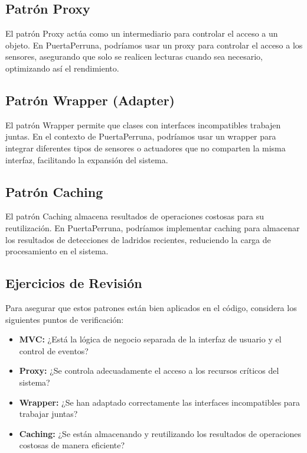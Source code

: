 \subsection{Patrón Proxy}

El patrón Proxy actúa como un intermediario para controlar el acceso a un objeto. En PuertaPerruna, podríamos usar un proxy para controlar el acceso a los sensores, asegurando que solo se realicen lecturas cuando sea necesario, optimizando así el rendimiento.

\subsection{Patrón Wrapper (Adapter)}

El patrón Wrapper permite que clases con interfaces incompatibles trabajen juntas. En el contexto de PuertaPerruna, podríamos usar un wrapper para integrar diferentes tipos de sensores o actuadores que no comparten la misma interfaz, facilitando la expansión del sistema.

\subsection{Patrón Caching}

El patrón Caching almacena resultados de operaciones costosas para su reutilización. En PuertaPerruna, podríamos implementar caching para almacenar los resultados de detecciones de ladridos recientes, reduciendo la carga de procesamiento en el sistema.

\subsection{Ejercicios de Revisión}

Para asegurar que estos patrones están bien aplicados en el código, considera los siguientes puntos de verificación:

\begin{itemize}
    \item \textbf{MVC:} ¿Está la lógica de negocio separada de la interfaz de usuario y el control de eventos?
    \item \textbf{Proxy:} ¿Se controla adecuadamente el acceso a los recursos críticos del sistema?
    \item \textbf{Wrapper:} ¿Se han adaptado correctamente las interfaces incompatibles para trabajar juntas?
    \item \textbf{Caching:} ¿Se están almacenando y reutilizando los resultados de operaciones costosas de manera eficiente?
\end{itemize}

